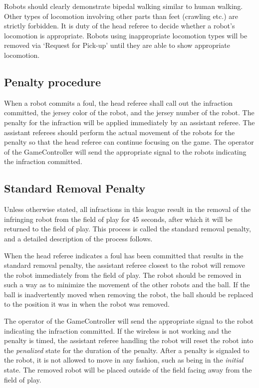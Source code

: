 \documentclass[12pt]{article}
\begin{document}
Robots should clearly demonstrate bipedal walking similar to human walking. Other types of locomotion involving other parts than feet (crawling etc.) are strictly forbidden. It is duty of the head referee to decide whether a robot's locomotion is appropriate. Robots using inappropriate locomotion types will be removed via `Request for Pick-up' until they are able to show appropriate locomotion.

\subsection{Penalty procedure}
\label{sec:penalty_procedure}

When a robot commits a foul, the head referee shall call out the infraction committed, the jersey color of the robot, and the jersey number of the robot. The penalty for the infraction will be applied immediately by an assistant referee. The assistant referees should perform the actual movement of the robots for the penalty so that the head referee can continue focusing on the game. The operator of the GameController will send the appropriate signal to the robots indicating the infraction committed.

\subsection{Standard Removal Penalty}
\label{sec:removal_penalty}

Unless otherwise stated, all infractions in this league result in the removal of the infringing robot from the field of play for 45 seconds, after which it will be returned to the field of play. This process is called the standard removal penalty, and a detailed description of the process follows.

When the head referee indicates a foul has been committed that results in the standard removal penalty, the assistant referee closest to the robot will remove the robot immediately from the field of play. The robot should be removed in such a way as to minimize the movement of the other robots and the ball. If the ball is inadvertently moved when removing the robot, the ball should be replaced to the position it was in when the robot was removed.

The operator of the GameController will send the appropriate signal to the robot indicating the infraction committed. If the wireless is not working and the penalty is timed, the assistant referee handling the robot will reset the robot into the \emph{penalized} state for the duration of the penalty. After a penalty is signaled to the robot, it is not allowed to move in any fashion, such as being in the \emph{initial} state. The removed robot will be placed outside of the field facing away from the field of play.
\end{document}
